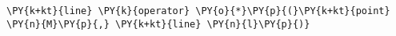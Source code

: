 \begin{Verbatim}[commandchars=\\\{\}]
    \PY{k+kt}{line} \PY{k}{operator} \PY{o}{*}\PY{p}{(}\PY{k+kt}{point} \PY{n}{M}\PY{p}{,} \PY{k+kt}{line} \PY{n}{l}\PY{p}{)}
\end{Verbatim}
